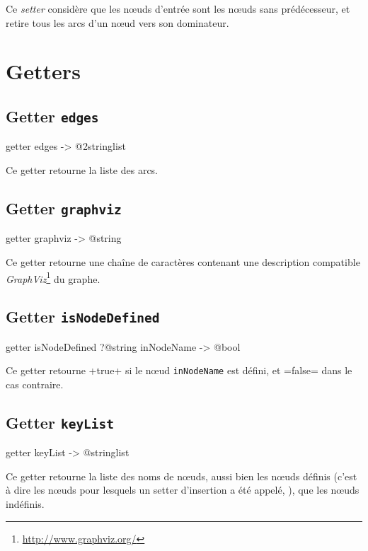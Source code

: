 Ce \emph{setter} considère que les nœuds d'entrée sont les nœuds sans prédécesseur, et retire tous les arcs d'un nœud vers son dominateur.

\section{Getters}

\subsection{Getter \texttt{edges}}

\begin{galgas}
getter edges -> @2stringlist 
\end{galgas}

Ce getter retourne la liste des arcs.


\subsection{Getter \texttt{graphviz}}

\begin{galgas}
getter graphviz -> @string 
\end{galgas}

Ce getter retourne une chaîne de caractères contenant une description compatible \emph{GraphViz}\footnote{\url{http://www.graphviz.org/}} du graphe.



\subsection{Getter \texttt{isNodeDefined}}

\begin{galgas}
getter isNodeDefined ?@string inNodeName -> @bool 
\end{galgas}

Ce getter retourne \ggs+true+ si le nœud \texttt{inNodeName} est défini, et \ggs=false= dans le cas contraire.


\subsection{Getter \texttt{keyList}}

\begin{galgas}
getter keyList -> @stringlist 
\end{galgas}

Ce getter retourne la liste des noms de nœuds, aussi bien les nœuds définis (c'est à dire les nœuds pour lesquels un setter d'insertion a été appelé, ), que les nœuds indéfinis.



